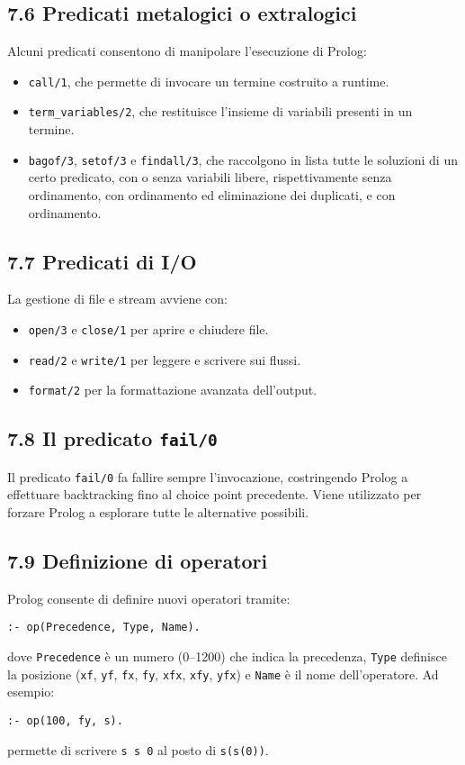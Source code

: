 \documentclass[12pt]{article}
\begin{document}
\subsection*{7.6 Predicati metalogici o extralogici}

Alcuni predicati consentono di manipolare l'esecuzione di Prolog:
\begin{itemize}
  \item \texttt{call/1}, che permette di invocare un termine costruito a runtime.
  \item \texttt{term\_variables/2}, che restituisce l'insieme di variabili presenti in un termine.
  \item \texttt{bagof/3}, \texttt{setof/3} e \texttt{findall/3}, che raccolgono in lista tutte le soluzioni di un certo predicato, con o senza variabili libere, rispettivamente senza ordinamento, con ordinamento ed eliminazione dei duplicati, e con ordinamento.
\end{itemize}

\subsection*{7.7 Predicati di I/O}

La gestione di file e stream avviene con:
\begin{itemize}
  \item \texttt{open/3} e \texttt{close/1} per aprire e chiudere file.
  \item \texttt{read/2} e \texttt{write/1} per leggere e scrivere sui flussi.
  \item \texttt{format/2} per la formattazione avanzata dell'output.
\end{itemize}

\subsection*{7.8 Il predicato \texttt{fail/0}}

Il predicato \texttt{fail/0} fa fallire sempre l'invocazione, costringendo Prolog a effettuare backtracking fino al choice point precedente. Viene utilizzato per forzare Prolog a esplorare tutte le alternative possibili.

\subsection*{7.9 Definizione di operatori}

Prolog consente di definire nuovi operatori tramite:
\begin{verbatim}
:- op(Precedence, Type, Name).
\end{verbatim}
dove \texttt{Precedence} è un numero (0--1200) che indica la precedenza, \texttt{Type} definisce la posizione (\texttt{xf}, \texttt{yf}, \texttt{fx}, \texttt{fy}, \texttt{xfx}, \texttt{xfy}, \texttt{yfx}) e \texttt{Name} è il nome dell'operatore. Ad esempio:
\begin{verbatim}
:- op(100, fy, s).
\end{verbatim}
permette di scrivere \texttt{s s 0} al posto di \texttt{s(s(0))}.
\end{document}
